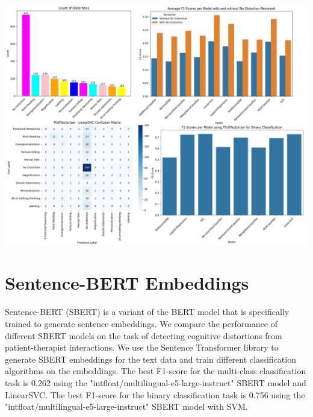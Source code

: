 \documentclass[a0,landscape]{a0poster}
\begin{document}
\begin{multicols}{4}
\begin{center}\vspace{0.5cm}
	\includegraphics[width=0.99\linewidth]{figures/1stFour.png}
\end{center}\vspace{0.5cm}

\color{Teal}
\section*{Sentence-BERT Embeddings}
\color{Black}

Sentence-BERT (SBERT) is a variant of the BERT model that is specifically trained to generate sentence embeddings. We compare the performance of different SBERT models on the task of detecting cognitive distortions from patient-therapist interactions. We use the Sentence Transformer library to generate SBERT embeddings for the text data and train different classification algorithms on the embeddings. The best F1-score for the multi-class classification task is 0.262 using the "intfloat/multilingual-e5-large-instruct" SBERT model and LinearSVC. The best F1-score for the binary classification task is 0.756 using the "intfloat/multilingual-e5-large-instruct" SBERT model with SVM.


\end{multicols}
\end{document}
